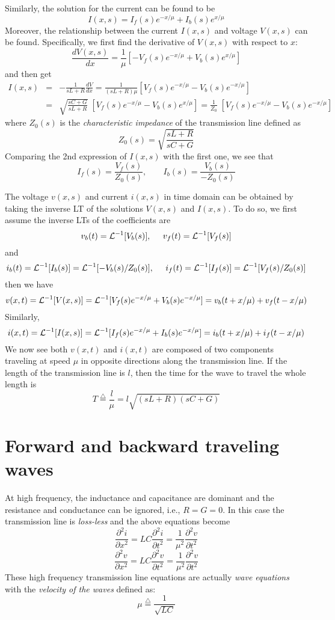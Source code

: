 Similarly, the solution for the current can be found to be
\[ I(x,s)=I_f(s) e^{-x/\mu}+I_b(s) e^{x/\mu} \]
Moreover, the relationship between the current $I(x,s)$ and voltage $V(x,s)$ 
can be found. Specifically, we first find the derivative of $V(x,s)$ with 
respect to $x$:
\[ \frac{dV(x,s)}{dx}=\frac{1}{\mu}[-V_f(s) e^{-x/\mu}+V_b(s) e^{x/\mu}] \]
and then get
\begin{eqnarray}
  I(x,s)&=&-\frac{1}{sL+R}\frac{dV}{dx}
  =\frac{1}{(sL+R)\mu}[V_f(s) e^{-x/\mu}-V_b(s) e^{-x/\mu}]
  \nonumber \\
  &=&\sqrt{\frac{sC+G}{sL+R}}\;[V_f(s) e^{-x/\mu}-V_b(s) e^{x/\mu}]
  =\frac{1}{Z_0}\;[V_f(s) e^{-x/\mu}-V_b(s) e^{-x/\mu}]
  \nonumber 
\end{eqnarray}
where $Z_0(s)$ is the {\em characteristic impedance} of the transmission line
defined as
\[ Z_0(s)=\sqrt{\frac{sL+R}{sC+G}} \]
Comparing the 2nd expression of $I(x,s)$ with the first one, we see that
\[ I_f(s)=\frac{V_f(s)}{Z_0(s)},\;\;\;\;\;\;\;I_b(s)=\frac{V_b(s)}{-Z_0(s)} \]

The voltage $v(x,s)$ and current $i(x,s)$ in time domain can be obtained by
taking the inverse LT of the solutions $V(x,s)$ and $I(x,s)$. To do so, we 
first assume the inverse LTs of the coefficients are
\[ v_b(t)={\cal L}^{-1}[V_b(s)],\;\;\;\;\;v_f(t)={\cal L}^{-1}[V_f(s)] \]
and
\[ i_b(t)={\cal L}^{-1}[I_b(s)]={\cal L}^{-1}[-V_b(s)/Z_0(s)],\;\;\;\;\;
i_f(t)={\cal L}^{-1}[I_f(s)]={\cal L}^{-1}[V_f(s)/Z_0(s)] \]
then we have
\[ v(x,t)={\cal L}^{-1}[V(x,s)]={\cal L}^{-1}[ V_f(s) e^{-x/\mu}+V_b(s) e^{-x/\mu} ]
=v_b(t+x/\mu)+v_f(t-x/\mu) \]
Similarly, 
\[ i(x,t)={\cal L}^{-1}[I(x,s)]={\cal L}^{-1}[ I_f(s) e^{-x/\mu}+I_b(s) e^{-x/\mu} ]
=i_b(t+x/\mu)+i_f(t-x/\mu) \]
We now see both $v(x,t)$ and $i(x,t)$ are composed of two components traveling
at speed $\mu$ in opposite directions along the transmission line. If the length 
of the transmission line is $l$, then the time for the wave to travel the whole 
length is
\[ T\stackrel{\triangle}{=}\frac{l}{\mu} =l \sqrt{(sL+R)(sC+G)} \]

\section*{Forward and backward traveling waves}


At high frequency, the inductance and capacitance are dominant and the 
resistance and conductance can be ignored, i.e., $R=G=0$. In this case the
transmission line is {\em loss-less} and the above equations become
\[
\frac{\partial^2 i}{\partial x^2}=LC \frac{\partial^2 i}{\partial t^2}=\frac{1}{\mu^2} \frac{\partial^2 v}{\partial t^2}
\]
\[
\frac{\partial^2 v}{\partial x^2}=LC \frac{\partial^2 v}{\partial t^2}=\frac{1}{\mu^2} \frac{\partial^2 v}{\partial t^2}
\]
These high frequency transmission line equations are actually {\em wave 
equations} with the {\em velocity of the waves} defined as:
\[	\mu \stackrel{\triangle}{=} \frac{1}{\sqrt{LC}}	\]


